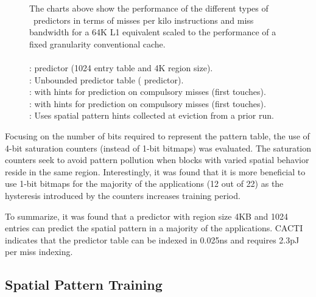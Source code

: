{{\begin{figure}[h]
    \caption[Predictor Performance]{ The charts above show the performance of the different types of \AC\ predictors in terms of misses per kilo instructions and miss bandwidth for a 64K L1 equivalent scaled to the performance of a fixed granularity conventional cache. \\ \\
      :  predictor (1024 entry table and 4K region size). \\
      : Unbounded predictor table ( predictor). \\ 
      :  with hints for prediction on compulsory misses (first touches). \\
      :  with hints for prediction on compulsory misses (first touches). \\
      : Uses spatial pattern hints collected at eviction from a prior run. 
    }
    \label{fig:Predictor_All_Apps}
\end{figure}

\clearpage

Focusing on the number of bits required to represent the pattern table, the use of 4-bit saturation counters (instead of 1-bit bitmaps) was evaluated. The saturation counters seek to avoid pattern pollution when blocks with varied spatial behavior reside in the same region. Interestingly, it was found that it is more beneficial to use 1-bit bitmaps for the majority of the applications (12 out of 22) as the hysteresis introduced by the counters increases training period.  

To summarize, it was found that a  predictor with region size 4KB and 1024 entries can predict the spatial pattern in a majority of the applications. CACTI indicates that the predictor table can be indexed in 0.025ns and requires 2.3pJ per miss indexing.

\subsection{Spatial Pattern Training} 

}}

